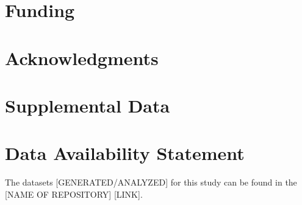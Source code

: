 \documentclass[utf8]{frontiersSCNS} %
\begin{document}

\section*{Funding}

\section*{Acknowledgments}

\section*{Supplemental Data}

\section*{Data Availability Statement}
The datasets [GENERATED/ANALYZED] for this study can be found in the [NAME OF REPOSITORY] [LINK].


\end{document}
